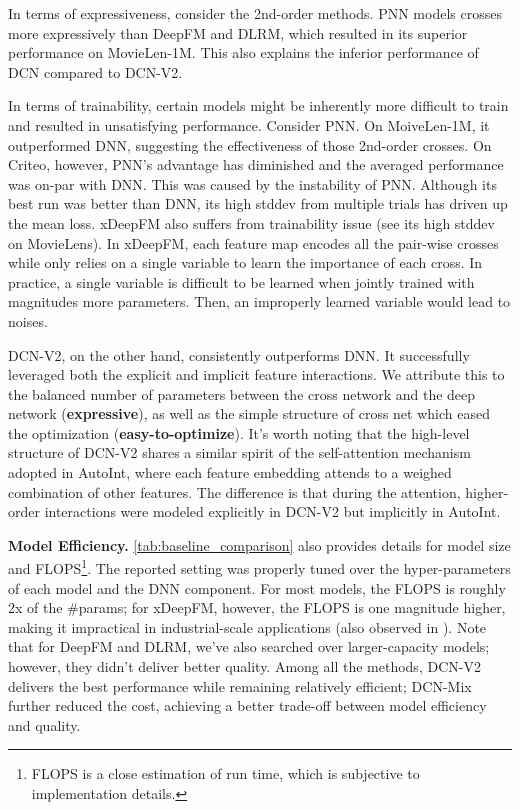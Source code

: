 \documentclass[sigconf]{acmart}
\begin{document}
In terms of expressiveness, consider the 2nd-order methods. PNN models crosses more expressively than DeepFM and DLRM, which resulted in its superior performance on MovieLen-1M. This also explains the inferior performance of DCN compared to {DCN-V2}.

In terms of trainability, certain models might be inherently more difficult to train and resulted in unsatisfying performance. Consider PNN. On MoiveLen-1M, it outperformed DNN, suggesting the effectiveness of those 2nd-order crosses. On Criteo, however, PNN's advantage has diminished and the averaged performance was on-par with DNN. This was caused by the instability of PNN. Although its best run was better than DNN, its high stddev from multiple trials has driven up the mean loss. xDeepFM also suffers from trainability issue (see its high stddev on MovieLens). In xDeepFM, each feature map encodes all the pair-wise crosses while only relies on a single variable to learn the importance of each cross. In practice, a single variable is difficult to be learned when jointly trained with magnitudes more parameters. Then, an improperly learned variable would lead to noises.



{DCN-V2}, on the other hand, consistently outperforms DNN. It successfully leveraged both the explicit and implicit feature interactions. We attribute this to the balanced number of parameters between the cross network and the deep network ({\bf expressive}), as well as the simple structure of cross net which eased the optimization ({\bf easy-to-optimize}). It's worth noting that the high-level structure of {DCN-V2} shares a similar spirit of the self-attention mechanism adopted in AutoInt, where each feature embedding attends to a weighed combination of other features. The difference is that during the attention, higher-order interactions were modeled explicitly in {DCN-V2} but implicitly in AutoInt.

{\bf Model Efficiency.} \autoref{tab:baseline_comparison} also provides details for model size and FLOPS\footnote{FLOPS is a close estimation of run time, which is subjective to implementation details.}. The reported setting was properly tuned over the hyper-parameters of each model and the DNN component. For most models, the FLOPS is roughly 2x of the \#params; for xDeepFM, however, the FLOPS is one magnitude higher, making it impractical in industrial-scale applications (also observed in \cite{song2019autoint}). Note that for DeepFM and DLRM, we've also searched over larger-capacity models; however, they didn't deliver better quality. Among all the methods, {DCN-V2} delivers the best performance while remaining relatively efficient; {DCN-Mix} further reduced the cost, achieving a better trade-off between model efficiency and quality.
\end{document}
